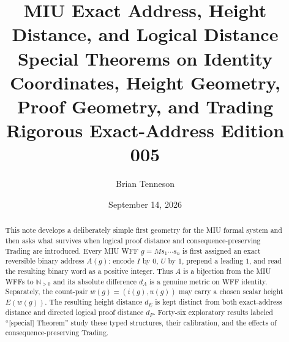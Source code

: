 \documentclass[11pt]{article}
\title{\textbf{MIU Exact Address, Height Distance, and Logical Distance}\\\large Special Theorems on Identity Coordinates, Height Geometry, Proof Geometry, and Trading\\[0.4em]\normalsize Rigorous Exact-Address Edition 005}
\author{Brian Tenneson}
\date{September 14, 2026}
\begin{document}
\maketitle

\begin{abstract}
This note develops a deliberately simple first geometry for the MIU formal system and then asks what survives when logical proof distance and consequence-preserving Trading are introduced. Every MIU WFF $g=M s_1\cdots s_n$ is first assigned an exact reversible binary address $A(g)$: encode $I$ by $0$, $U$ by $1$, prepend a leading $1$, and read the resulting binary word as a positive integer. Thus $A$ is a bijection from the MIU WFFs to $\mathbb N_{>0}$ and its absolute difference $d_A$ is a genuine metric on WFF identity. Separately, the count-pair $w(g)=(i(g),u(g))$ may carry a chosen scalar height $E(w(g))$. The resulting height distance $d_E$ is kept distinct from both exact-address distance and directed logical proof distance $d_P$. Forty-six exploratory results labeled ``[special] Theorem'' study these typed structures, their calibration, and the effects of consequence-preserving Trading.
\end{abstract}
\end{document}
